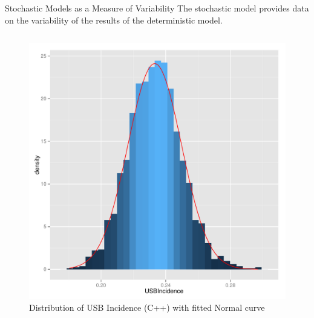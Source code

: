 \documentclass[final]{beamer}
\begin{document}
\begin{frame}
\begin{columns}
\begin{column}{.3\textwidth}
      \begin{block}{Stochastic Models as a Measure of Variability}
        The stochastic model provides data on the variability of the results
        of the deterministic model.
        \begin{block}{}
          \vspace{-2em}
          \begin{column}{.45\textwidth}
            \begin{figure}[h]
              \begin{center}
                \includegraphics[width=\textwidth]{IN0dist}
              \end{center}
              \caption{Distribution of USB Incidence (C++) with fitted Normal curve}
              \label{fig:IN0dist}
            \end{figure}
          \end{column}
          \begin{column}{.45\textwidth}
            \begin{figure}[h]
              \begin{center}

\end{center}
\end{figure}
\end{column}
\end{block}
\end{block}
\end{column}
\end{columns}
\end{frame}
\end{document}
